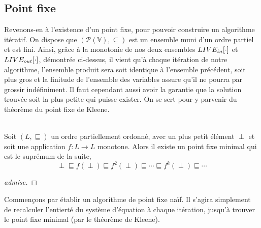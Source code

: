 \documentclass[a4paper, 10pt]{article}
\begin{document}
\subsection{Point fixe}
Revenons-en à l'existence d'un point fixe, pour pouvoir construire un algorithme itératif. On dispose que 
$(\mathcal{P}(\mathbb{V}), \subseteq)$ est un ensemble muni d'un ordre partiel et est fini.
Ainsi, grâce à la monotonie de nos deux ensembles $LIVE_{in}[\cdot]$ et $LIVE_{out}[\cdot]$, démontrée ci-dessus, il
vient qu'à chaque itération de notre algorithme, l'ensemble produit sera soit identique à l'ensemble précédent,
soit plus gros et la finitude de l'ensemble des variables assure qu'il ne pourra par grossir indéfiniment. 
Il faut cependant aussi avoir la garantie que la solution trouvée soit la plus petite qui puisse exister.
On se sert pour y parvenir du théorème du point fixe de Kleene.
\\
\\
\begin{theorem}
	Soit $(L, \sqsubseteq)$ un ordre partiellement ordonné, avec un plus petit élément  $\perp$ et soit
	une application $f : L \longrightarrow L$ monotone. Alors il existe un point fixe minimal qui est le suprémum de la suite,
	\[\perp \sqsubseteq f(\perp) \sqsubseteq f^2(\perp) \sqsubseteq \cdots \sqsubseteq f^k(\perp) \sqsubseteq \cdots\]
\end{theorem}
\begin{proof}
	[admise]
\end{proof}
Commençons par établir un algorithme de point fixe naïf. Il s'agira simplement de recalculer l'entierté du système
d'équation à chaque itération, jusqu'à trouver le point fixe minimal (par le théorème de Kleene).
\end{document}

